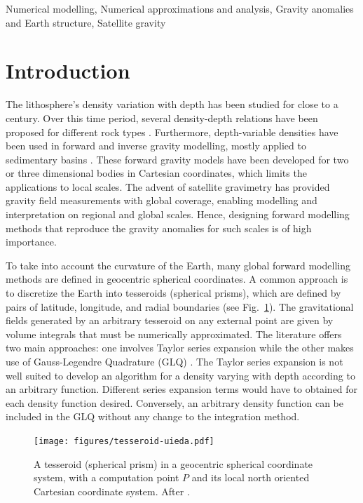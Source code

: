 \documentclass[extra, referee]{gji}
\begin{document}
\begin{keywords}
Numerical modelling, Numerical approximations and analysis, Gravity anomalies
and Earth structure, Satellite gravity
\end{keywords}


\section{Introduction}

The lithosphere's density variation with depth has been studied for close to a
century.
Over this time period,
several density-depth relations have been proposed for different rock types
\citep[e.g.,][]{Maxant1980, Rao1986, Rao1993, Rao1994}.
Furthermore, depth-variable densities have been used in forward and
inverse gravity modelling, mostly applied to sedimentary basins
\citep{Cordell1973, Rao1986, Cowie1990, Rao1993, Rao1994, Zhang2001,
Welford2010}.
These forward gravity models have been developed for two or three dimensional
bodies in Cartesian coordinates, which limits the applications to local scales.
The advent of satellite gravimetry has provided gravity field
measurements with global coverage, enabling modelling and interpretation on regional and
global scales.
Hence, designing forward modelling methods that reproduce the gravity anomalies for
such scales is of high importance.

To take into account the curvature of the Earth, many global forward modelling methods
are defined in geocentric spherical coordinates.
A common approach is to discretize the Earth into tesseroids (spherical prisms),
which are defined by pairs of latitude, longitude, and
radial boundaries (see Fig.~\ref{fig:tesseroid}).
The gravitational fields generated by an arbitrary
tesseroid on any external point are given by volume
integrals that must be numerically approximated.
The literature offers two main approaches: one involves Taylor series expansion
\citep{Heck2007, Grombein2013} while the other makes use of Gauss-Legendre
Quadrature (GLQ)
\citep{Asgharzadeh2007, Wild-Pfeiffer2008, Li2011, Uieda2016}.
The Taylor series expansion is not well suited to develop an algorithm for
a density varying with depth according to an arbitrary function.
Different series expansion terms would have to obtained for each density function
desired.
Conversely, an arbitrary density function can be included in the GLQ without
any change to the integration method.

\begin{figure}
\centering
\texttt{[image: figures/tesseroid-uieda.pdf]}
\caption{
    A tesseroid (spherical prism) in a geocentric spherical coordinate system, with a
    computation point $P$ and its local north oriented Cartesian coordinate system.
    After \citet{Uieda2015}.
}
\label{fig:tesseroid}
\end{figure}
\end{document}
